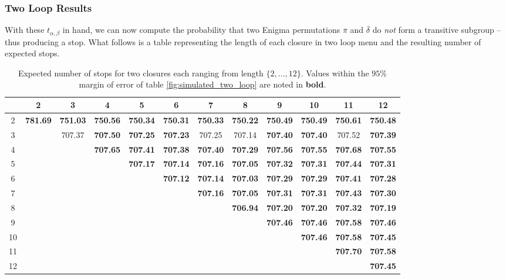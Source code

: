 \subsubsection{Two Loop Results}
With these $t_{\alpha, \beta}$ in hand, we can now compute the probability that two Enigma permutations $\overline\pi$ and $\overline\delta$ do \emph{not} form a transitive subgroup -- thus producing a stop. What follows is a table representing the length of each closure in two loop menu and the resulting number of expected stops. 
\begin{table}[H]
\centering
\begin{adjustbox}{max width=\textwidth,max height=2\textheight}
\begin{tabular}{|c|c|c|c|c|c|c|c|c|c|c|c|}
\hline
 & 2 & 3 & 4 & 5 & 6 & 7 & 8 & 9 & 10 & 11 & 12 \\
\hline
2 & \textbf{781.69} & \textbf{751.03} & \textbf{750.56} & \textbf{750.34} & \textbf{750.31} & \textbf{750.33} & \textbf{750.22} & \textbf{750.49} & \textbf{750.49} & \textbf{750.61} & \textbf{750.48} \\
\hline
3 & & 707.37 & \textbf{707.50} & \textbf{707.25} & \textbf{707.23} & 707.25 & 707.14 & \textbf{707.40} & \textbf{707.40} & 707.52 & \textbf{707.39} \\
\hline
4 & & & \textbf{707.65} & \textbf{707.41} & \textbf{707.38} & \textbf{707.40} & \textbf{707.29} & \textbf{707.56} & \textbf{707.55} & \textbf{707.68} & \textbf{707.55} \\
\hline
5 & & & & \textbf{707.17} & \textbf{707.14} & \textbf{707.16} & \textbf{707.05} & \textbf{707.32} & \textbf{707.31} & \textbf{707.44} & \textbf{707.31} \\
\hline
6 & & & & & \textbf{707.12} & \textbf{707.14} & \textbf{707.03} & \textbf{707.29} & \textbf{707.29} & \textbf{707.41} & \textbf{707.28} \\
\hline
7 & & & & & & \textbf{707.16} & \textbf{707.05} & \textbf{707.31} & \textbf{707.31} & \textbf{707.43} & \textbf{707.30} \\
\hline
8 & & & & & & & \textbf{706.94} & \textbf{707.20} & \textbf{707.20} & \textbf{707.32} & \textbf{707.19} \\
\hline
9 & & & & & & & & \textbf{707.46} & \textbf{707.46} & \textbf{707.58} & \textbf{707.46} \\
\hline
10 & & & & & & & & & \textbf{707.46} & \textbf{707.58} & \textbf{707.45} \\
\hline
11 & & & & & & & & & & \textbf{707.70} & \textbf{707.58} \\
\hline
12 & & & & & & & & & & & \textbf{707.45} \\
\hline
\end{tabular}

\end{adjustbox}
\caption{Expected number of stops for two closures each ranging from length $\{2,\dots,12\}$. Values within the $95\%$ margin of error of table \protect\ref{fig:simulated_two_loop} are noted in \textbf{bold}.}
\end{table}


